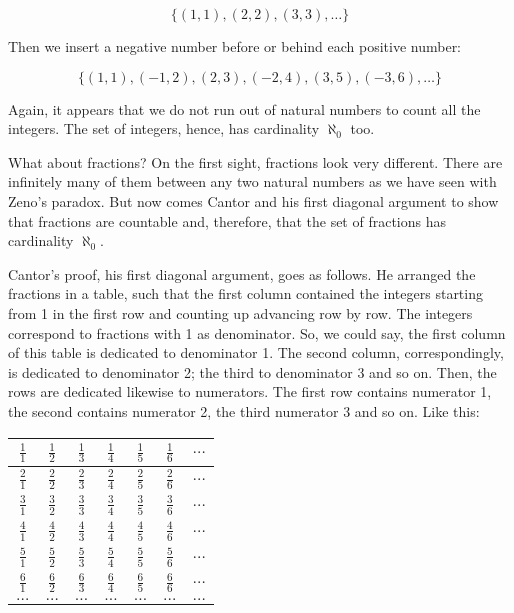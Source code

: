 \documentclass[tikz]{scrreprt}
\begin{document}
\[
\lbrace(1,1),(2,2),(3,3),\dots\rbrace
\]

Then we insert a negative number before or behind
each positive number:

\[
\lbrace(1,1),(-1,2),(2,3),(-2,4),(3,5),(-3,6),\dots\rbrace
\]

Again, it appears that we do not run out of natural numbers
to count all the integers. The set of integers,
hence, has cardinality $\aleph_0$ too.

What about fractions?
On the first sight, fractions look very different.
There are infinitely many of them between
any two natural numbers as we have seen 
with Zeno's paradox.
But now comes Cantor and his first
diagonal argument to show that fractions
are countable and, therefore, that the set of fractions
has cardinality $\aleph_0$.

Cantor's proof, his first diagonal argument,
goes as follows. He arranged the fractions
in a table, such that the first column contained
the integers starting from 1 in the first row
and counting up advancing row by row.
The integers correspond to fractions with 1
as denominator. So, we could say,
the first column of this table is dedicated
to denominator 1. The second column, correspondingly,
is dedicated to denominator 2; the third
to denominator 3 and so on.
Then, the rows are dedicated likewise to numerators.
The first row contains numerator 1, the second
contains numerator 2, the third numerator 3
and so on.
Like this:

\begin{center}
\begingroup
\renewcommand{\arraystretch}{1.5}
\begin{tabular}{|c|c|c|c|c|c|c}\hline
$\frac{1}{1}$ & $\frac{1}{2}$ & $\frac{1}{3}$ & $\frac{1}{4}$ & $\frac{1}{5}$ & $\frac{1}{6}$ & $\dots$\\\hline
$\frac{2}{1}$ & $\frac{2}{2}$ & $\frac{2}{3}$ & $\frac{2}{4}$ & $\frac{2}{5}$ & $\frac{2}{6}$ & $\dots$\\\hline
$\frac{3}{1}$ & $\frac{3}{2}$ & $\frac{3}{3}$ & $\frac{3}{4}$ & $\frac{3}{5}$ & $\frac{3}{6}$ & $\dots$\\\hline
$\frac{4}{1}$ & $\frac{4}{2}$ & $\frac{4}{3}$ & $\frac{4}{4}$ & $\frac{4}{5}$ & $\frac{4}{6}$ & $\dots$\\\hline
$\frac{5}{1}$ & $\frac{5}{2}$ & $\frac{5}{3}$ & $\frac{5}{4}$ & $\frac{5}{5}$ & $\frac{5}{6}$ & $\dots$\\\hline
$\frac{6}{1}$ & $\frac{6}{2}$ & $\frac{6}{3}$ & $\frac{6}{4}$ & $\frac{6}{5}$ & $\frac{6}{6}$ & $\dots$\\\hline
$\dots$       & $\dots$       & $\dots$       & $\dots$       & $\dots$       & $\dots$       & $\dots$
\end{tabular}
\endgroup
\end{center}
\end{document}
